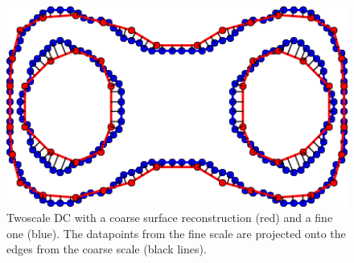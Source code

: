 \begin{figure}
\begin{center}
\includegraphics[width=.5 \textwidth]{Pictures/SurfaceReconstruction/TwoScale}
\caption{Twoscale \acl{DC} with a coarse surface reconstruction (red) and a fine one (blue). The datapoints from the fine scale are projected onto the edges from the coarse scale (black lines).}
\label{fig:TwoScale}
\end{center}
\end{figure}

